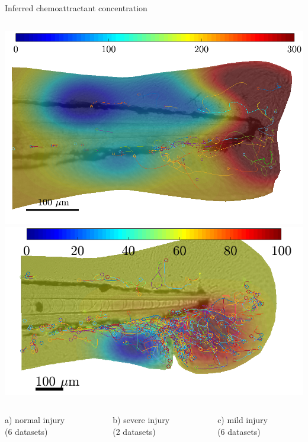 \documentclass[mathserif,11pt]{beamer}
\begin{document}
\begin{frame}{Inferred chemoattractant concentration}
\begin{columns}
\begin{column}{0.3\textwidth}
		\includegraphics[scale=0.14]{Figures/n3_p1_ukf_tracks.png}
		\vspace{0.6cm}
		\includegraphics[scale=0.2]{Figures/nick4_4x4_05.png}
	\end{column}
\end{columns}
\begin{columns}
	\begin{column}{0.3\textwidth}
		\centering
		\footnotesize{ a) normal injury}\\
		\footnotesize{(6 datasets)}
	\end{column}
	\begin{column}{0.3\textwidth}
		\centering
	\footnotesize{ b) severe injury}\\
	\footnotesize{(2 datasets)}
\end{column}
	\begin{column}{0.3\textwidth}
		\centering
	\footnotesize{ c) mild injury}\\
	\footnotesize{(6 datasets)}
\end{column}
\end{columns}
\end{frame}
\end{document}
